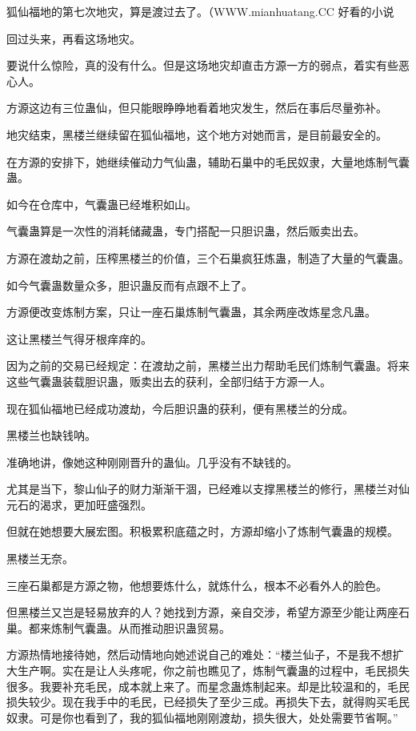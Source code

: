 
\begin{this_body}

狐仙福地的第七次地灾，算是渡过去了。（WWW.mianhuatang.CC 好看的小说

回过头来，再看这场地灾。

要说什么惊险，真的没有什么。但是这场地灾却直击方源一方的弱点，着实有些恶心人。

方源这边有三位蛊仙，但只能眼睁睁地看着地灾发生，然后在事后尽量弥补。

地灾结束，黑楼兰继续留在狐仙福地，这个地方对她而言，是目前最安全的。

在方源的安排下，她继续催动力气仙蛊，辅助石巢中的毛民奴隶，大量地炼制气囊蛊。

如今在仓库中，气囊蛊已经堆积如山。

气囊蛊算是一次性的消耗储藏蛊，专门搭配一只胆识蛊，然后贩卖出去。

方源在渡劫之前，压榨黑楼兰的价值，三个石巢疯狂炼蛊，制造了大量的气囊蛊。

如今气囊蛊数量众多，胆识蛊反而有点跟不上了。

方源便改变炼制方案，只让一座石巢炼制气囊蛊，其余两座改炼星念凡蛊。

这让黑楼兰气得牙根痒痒的。

因为之前的交易已经规定：在渡劫之前，黑楼兰出力帮助毛民们炼制气囊蛊。将来这些气囊蛊装载胆识蛊，贩卖出去的获利，全部归结于方源一人。

现在狐仙福地已经成功渡劫，今后胆识蛊的获利，便有黑楼兰的分成。

黑楼兰也缺钱呐。

准确地讲，像她这种刚刚晋升的蛊仙。几乎没有不缺钱的。

尤其是当下，黎山仙子的财力渐渐干涸，已经难以支撑黑楼兰的修行，黑楼兰对仙元石的渴求，更加旺盛强烈。

但就在她想要大展宏图。积极累积底蕴之时，方源却缩小了炼制气囊蛊的规模。

黑楼兰无奈。

三座石巢都是方源之物，他想要炼什么，就炼什么，根本不必看外人的脸色。

但黑楼兰又岂是轻易放弃的人？她找到方源，亲自交涉，希望方源至少能让两座石巢。都来炼制气囊蛊。从而推动胆识蛊贸易。

方源热情地接待她，然后动情地向她述说自己的难处：“楼兰仙子，不是我不想扩大生产啊。实在是让人头疼呢，你之前也瞧见了，炼制气囊蛊的过程中，毛民损失很多。我要补充毛民，成本就上来了。而星念蛊炼制起来。却是比较温和的，毛民损失较少。现在我手中的毛民，已经损失了至少三成。再损失下去，就得购买毛民奴隶。可是你也看到了，我的狐仙福地刚刚渡劫，损失很大，处处需要节省啊。”


\end{this_body}
